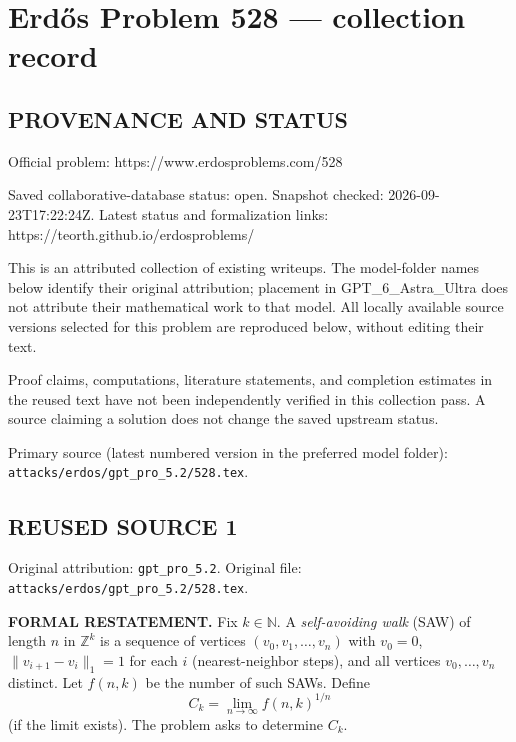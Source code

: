 \section*{Erd\H{o}s Problem 528 --- collection record}

\subsection*{PROVENANCE AND STATUS}
Official problem: https://www.erdosproblems.com/528

Saved collaborative-database status: open.
Snapshot checked: 2026-09-23T17:22:24Z.
Latest status and formalization links: https://teorth.github.io/erdosproblems/

This is an attributed collection of existing writeups. The model-folder names below identify their original attribution; placement in GPT\_6\_Astra\_Ultra does not attribute their mathematical work to that model. All locally available source versions selected for this problem are reproduced below, without editing their text.

Proof claims, computations, literature statements, and completion estimates in the reused text have not been independently verified in this collection pass. A source claiming a solution does not change the saved upstream status.

Primary source (latest numbered version in the preferred model folder): \texttt{attacks/erdos/gpt\_pro\_5.2/528.tex}.

\subsection*{REUSED SOURCE 1}
Original attribution: \texttt{gpt\_pro\_5.2}.
Original file: \texttt{attacks/erdos/gpt\_pro\_5.2/528.tex}.


\noindent\textbf{FORMAL RESTATEMENT.}
Fix $k\in\mathbb N$.
A \emph{self-avoiding walk} (SAW) of length $n$ in $\mathbb Z^k$ is a sequence of vertices $(v_0,v_1,\dots,v_n)$ with $v_0=0$, $\|v_{i+1}-v_i\|_1=1$ for each $i$ (nearest-neighbor steps), and all vertices $v_0,\dots,v_n$ distinct.
Let $f(n,k)$ be the number of such SAWs.
Define
\[C_k = \lim_{n\to\infty} f(n,k)^{1/n}
\]
(if the limit exists). The problem asks to determine $C_k$.

